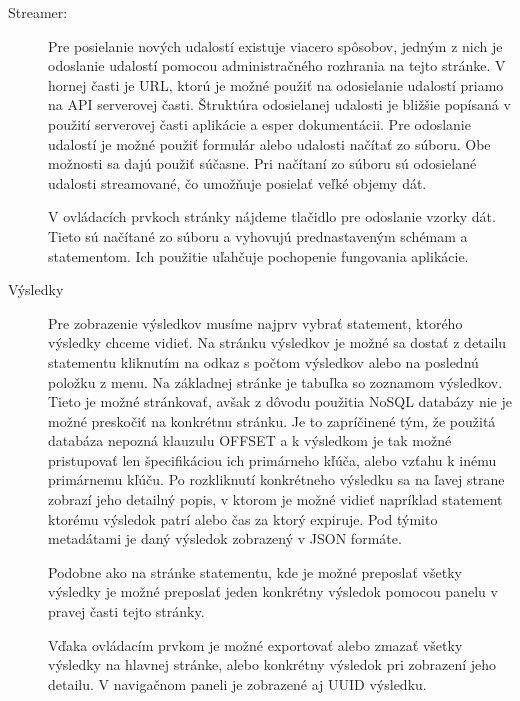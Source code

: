 \begin{description}
		\item[Streamer:] Pre posielanie nových udalostí existuje viacero spôsobov, jedným z nich je odoslanie udalostí pomocou administračného rozhrania na tejto stránke. V hornej časti je URL, ktorú je možné použiť na odosielanie udalostí priamo na API serverovej časti. Štruktúra odosielanej udalosti je bližšie popísaná v použití serverovej časti aplikácie a esper dokumentácii.
		Pre odoslanie udalostí je možné použiť formulár alebo udalosti načítať zo súboru. Obe možnosti sa dajú použiť súčasne. Pri načítaní zo súboru sú odosielané udalosti streamované, čo umožňuje posielať veľké objemy dát.

		V ovládacích prvkoch stránky nájdeme tlačidlo pre odoslanie vzorky dát. Tieto sú načítané zo súboru a vyhovujú prednastaveným schémam a statementom. Ich použitie uľahčuje pochopenie fungovania aplikácie.
		
		\item[Výsledky] Pre zobrazenie výsledkov musíme najprv vybrať statement, ktorého výsledky chceme vidieť. Na stránku výsledkov je možné sa dostať z detailu statementu kliknutím na odkaz s počtom výsledkov alebo na poslednú položku z menu.
		Na základnej stránke je tabuľka so zoznamom výsledkov. Tieto je možné stránkovať, avšak z dôvodu použitia NoSQL databázy nie je možné preskočiť na konkrétnu stránku. Je to zapríčinené tým, že použitá databáza nepozná klauzulu OFFSET a k výsledkom je tak možné pristupovať len špecifikáciou ich primárneho kľúča, alebo vzťahu k inému primárnemu kľúču.
		Po rozkliknutí konkrétneho výsledku sa na ľavej strane zobrazí jeho detailný popis, v ktorom je možné vidieť napríklad statement ktorému výsledok patrí alebo čas za ktorý expiruje. Pod týmito metadátami je daný výsledok zobrazený v JSON formáte.
		
		Podobne ako na stránke statementu, kde je možné preposlať všetky výsledky je možné preposlať jeden konkrétny výsledok pomocou panelu v pravej časti tejto stránky.

		Vďaka ovládacím prvkom je možné exportovať alebo zmazať všetky výsledky na hlavnej stránke, alebo konkrétny výsledok pri zobrazení jeho detailu. V navigačnom paneli je zobrazené aj UUID výsledku.
	\end{description}
	
	
	
